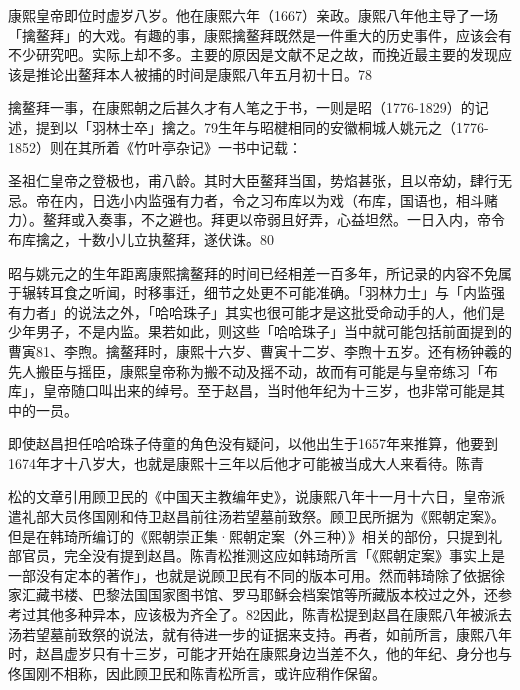 康熙皇帝即位时虚岁八岁。他在康熙六年（1667）亲政。康熙八年他主导了一场「擒鳌拜」的大戏。有趣的事，康熙擒鳌拜既然是一件重大的历史事件，应该会有不少研究吧。实际上却不多。主要的原因是文献不足之故，而挽近最主要的发现应该是推论出鳌拜本人被捕的时间是康熙八年五月初十日。78

擒鳌拜一事，在康熙朝之后甚久才有人笔之于书，一则是昭（1776-1829）的记述，提到以「羽林士卒」擒之。79生年与昭楗相同的安徽桐城人姚元之（1776-1852）则在其所着《竹叶亭杂记》一书中记载：

\begin{BookQuote}
圣祖仁皇帝之登极也，甫八龄。其时大臣鳌拜当国，势焰甚张，且以帝幼，肆行无忌。帝在内，日选小内监强有力者，令之习布库以为戏（布库，国语也，相斗赌力）。鳌拜或入奏事，不之避也。拜更以帝弱且好弄，心益坦然。一日入内，帝令布库擒之，十数小儿立执鳌拜，遂伏诛。80
\end{BookQuote}

昭与姚元之的生年距离康熙擒鳌拜的时间已经相差一百多年，所记录的内容不免属于辗转耳食之听闻，时移事迁，细节之处更不可能准确。「羽林力士」与「内监强有力者」的说法之外，「哈哈珠子」其实也很可能才是这批受命动手的人，他们是少年男子，不是内监。果若如此，则这些「哈哈珠子」当中就可能包括前面提到的曹寅81、李煦。擒鳌拜时，康熙十六岁、曹寅十二岁、李煦十五岁。还有杨钟羲的先人搬臣与摇臣，康熙皇帝称为搬不动及摇不动，故而有可能是与皇帝练习「布库」，皇帝随口叫出来的绰号。至于赵昌，当时他年纪为十三岁，也非常可能是其中的一员。


即使赵昌担任哈哈珠子侍童的角色没有疑问，以他出生于1657年来推算，他要到1674年才十八岁大，也就是康熙十三年以后他才可能被当成大人来看待。陈青

\vfill
\begin{BookNotes}
\end{BookNotes}

\noindent 松的文章引用顾卫民的《中国天主教编年史》，说康熙八年十一月十六日，皇帝派遣礼部大员佟国刚和侍卫赵昌前往汤若望墓前致祭。顾卫民所据为《熙朝定案》。但是在韩琦所编订的《熙朝崇正集·熙朝定案（外三种）》相关的部份，只提到礼部官员，完全没有提到赵昌。陈青松推测这应如韩琦所言「《熙朝定案》事实上是一部没有定本的著作」，也就是说顾卫民有不同的版本可用。然而韩琦除了依据徐家汇藏书楼、巴黎法国国家图书馆、罗马耶稣会档案馆等所藏版本校过之外，还参考过其他多种异本，应该极为齐全了。82因此，陈青松提到赵昌在康熙八年被派去汤若望墓前致祭的说法，就有待进一步的证据来支持。再者，如前所言，康熙八年时，赵昌虚岁只有十三岁，可能才开始在康熙身边当差不久，他的年纪、身分也与佟国刚不相称，因此顾卫民和陈青松所言，或许应稍作保留。


